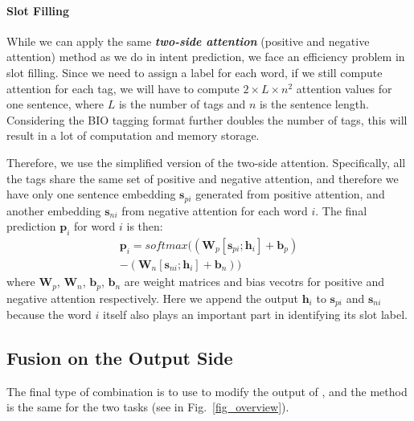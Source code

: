 \paragraph{Slot Filling}
While we can apply the same \textbf{\emph{two-side attention}} (positive and negative attention) method as we do in intent prediction, we face an efficiency problem in slot filling. Since we need to assign a label for each word, if we still compute attention for each tag, we will have to compute $2\times L \times n^2$ attention values for one sentence, where $L$ is the number of tags and $n$ is the sentence length. Considering the BIO tagging format further doubles the number of tags, this will result in a lot of computation and memory storage. 

Therefore, we use the simplified version of the two-side attention. Specifically, all the tags share the same set of positive and negative attention, and therefore we have only one sentence embedding $\textbf{s}_{pi}$ generated from positive attention, and another embedding $\textbf{s}_{ni}$ from negative attention for each word $i$. The final prediction $\textbf{p}_i$ for word $i$ is then:
\begin{equation}
\begin{split}
\textbf{p}_i = softmax((\textbf{W}_p [\textbf{s}_{pi}; \textbf{h}_i] + \textbf{b}_p) \\- (\textbf{W}_n [\textbf{s}_{ni}; \textbf{h}_i] + \textbf{b}_n))
\end{split} 
\end{equation} 
where $\textbf{W}_{p}$, $\textbf{W}_{n}$, $\textbf{b}_{p}$, $\textbf{b}_{n}$ are weight matrices and bias vecotrs for positive and negative attention respectively. Here we append the \BLSTM output $\textbf{h}_i$ to $\textbf{s}_{pi}$ and $\textbf{s}_{ni}$ because the word $i$ itself also plays an important part in identifying its slot label.

\subsection{Fusion on the Output Side}
\label{fusion_with_output}
The final type of combination is to use \RE to modify the output of \NN, and the method is the same for the two tasks (see  in Fig.~\ref{fig_overview}). 



